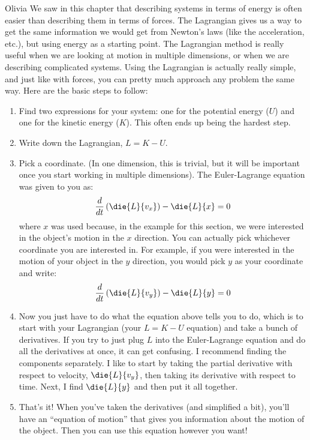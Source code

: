 \begin{studentOpinion}{Olivia}
We saw in this chapter that describing systems in terms of energy is often easier than describing them in terms of forces. The Lagrangian gives us a way to get the same information we would get from Newton's laws (like the acceleration, etc.), but using energy as a starting point. The Lagrangian method is really useful when we are looking at motion in multiple dimensions, or when we are describing complicated systems. Using the Lagrangian is actually really simple, and just like with forces, you can pretty much approach any problem the same way. Here are the basic steps to follow:
\begin{enumerate}
\item Find two expressions for your system: one for the potential energy ($U$) and one for the kinetic energy ($K$). This often ends up being the hardest step.
\item Write down the Lagrangian, $L=K-U$.
\item Pick a coordinate. (In one dimension, this is trivial, but it will be important once you start working in multiple dimensions). The Euler-Lagrange equation was given to you as:
\begin{align*}
\frac{d}{dt}\left(\die{L}{v_x}\right)-\die{L}{x} = 0
\end{align*}
where $x$ was used because, in the example for this section, we were interested in the object's motion in the $x$ direction. You can actually pick whichever coordinate you are interested in. For example, if you were interested in the motion of your object in the $y$ direction, you would pick $y$ as your coordinate and write:
\begin{align*}
\frac{d}{dt}\left(\die{L}{v_y}\right)-\die{L}{y} = 0
\end{align*}
\item Now you just have to do what the equation above tells you to do, which is to start with your Lagrangian (your $L=K-U$ equation) and take a bunch of derivatives. If you try to just plug $L$ into the Euler-Lagrange equation and do all the derivatives at once, it can get confusing. I recommend finding the components separately. I like to start by taking the partial derivative with respect to velocity, $\die{L}{v_y}$, then taking its derivative with respect to time. Next, I find $\die{L}{y}$ and then put it all together.
\item That's it! When you've taken the derivatives (and simplified a bit), you'll have an ``equation of motion'' that gives you information about the motion of the object. Then you can use this equation however you want! 
\end{enumerate}
\end{studentOpinion}

